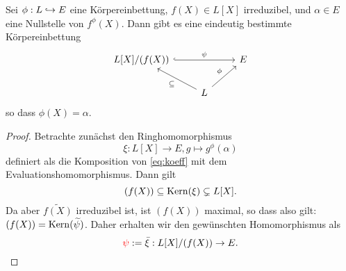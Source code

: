 \documentclass{book}
\begin{document}
\begin{lem}
    \label{lem:primitive}
    Sei $\phi: L \hra E$ eine Körpereinbettung, $f(X) \in L[X]$ irreduzibel,
    und $\alpha \in E$ eine Nullstelle von $f^{\phi}(X)$. Dann gibt es eine
    eindeutig bestimmte Körpereinbettung
        \[
        \begin{tikzcd}
            L[X]/(f(X)) \ar[hook]{rr}{\psi} & &E\\
                                                 & L\ar{ul}{\subset} \ar{ur}{\phi} & 
        \end{tikzcd}
        \]
        so dass $\phi(X) = \alpha$. 
\end{lem}
\begin{proof}
    Betrachte zunächst den Ringhomomorphismus
    \[
       {\xi}: L[X] \to E, g \mapsto g^\phi(\alpha)
    \]
    definiert als die Komposition von \eqref{eq:koeff} mit dem
    Evaluationshomomorphismus. Dann gilt 
    \[
        (f(X)) \subseteq \operatorname{Kern}(\xi) \subsetneq L[X].
    \]
    Da aber $\widetilde{f(X)}$ irreduzibel ist, ist $(f(X))$ maximal, so dass
    also gilt: $(f(X)) =  \operatorname{Kern}(\widetilde{\psi})$. Daher erhalten wir den
    gewünschten Homomorphismus als
    \[
        \textcolor{red}{\psi} := \bar{\xi}: L[X]/(f(X)) \to E.
    \]
\end{proof}
\end{document}
